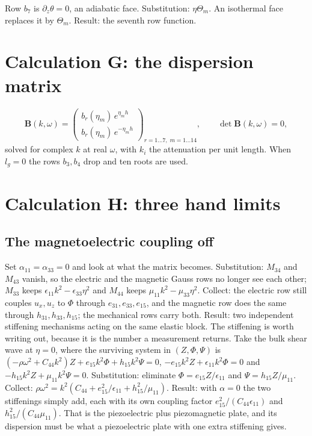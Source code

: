 \documentclass[11pt]{article}
\makeatletter
\newif\ifshowworked
\newenvironment{worked}{%
  \ifshowworked\par\smallskip\noindent\textit{Working.}\par\smallskip\else
  \setbox\z@\vbox\bgroup\fi}{\ifshowworked\par\smallskip\else\egroup\fi}
\makeatother
\begin{document}
\begin{worked}
Row $b_7$ is $\partial_z\theta=0$, an adiabatic face. Substitution: $\eta\Theta_m$. An isothermal face
replaces it by $\Theta_m$. Result: the seventh row function.
\end{worked}

\section{Calculation G: the dispersion matrix}\label{sec:calcG}

\begin{equation}
\mathbf B(k,\omega)=
\begin{pmatrix}
b_r(\eta_m)\,e^{\eta_mh}\\
b_r(\eta_m)\,e^{-\eta_mh}
\end{pmatrix}_{r=1\dots7,\;m=1\dots14},
\qquad \det\mathbf B(k,\omega)=0 ,
\end{equation}
solved for complex $k$ at real $\omega$, with $k_i$ the attenuation per unit length. When $l_g=0$ the rows
$b_3,b_4$ drop and ten roots are used.

\section{Calculation H: three hand limits}\label{sec:calcH}

\subsection*{The magnetoelectric coupling off}

\begin{worked}
Set $\alpha_{11}=\alpha_{33}=0$ and look at what the matrix becomes. Substitution: $M_{34}$ and $M_{43}$
vanish, so the electric and the magnetic Gauss rows no longer see each other; $M_{33}$ keeps
$\epsilon_{11}k^2-\epsilon_{33}\eta^2$ and $M_{44}$ keeps $\mu_{11}k^2-\mu_{33}\eta^2$. Collect: the
electric row still couples $u_x,u_z$ to $\Phi$ through $e_{31},e_{33},e_{15}$, and the magnetic row does
the same through $h_{31},h_{33},h_{15}$; the mechanical rows carry both. Result: two independent
stiffening mechanisms acting on the same elastic block.
The stiffening is worth writing out, because it is the number a measurement returns. Take the bulk shear
wave at $\eta=0$, where the surviving system in $(Z,\Phi,\Psi)$ is
$(-\rho\omega^2+C_{44}k^2)Z+e_{15}k^2\Phi+h_{15}k^2\Psi=0$,
$-e_{15}k^2Z+\epsilon_{11}k^2\Phi=0$ and $-h_{15}k^2Z+\mu_{11}k^2\Psi=0$.
Substitution: eliminate $\Phi=e_{15}Z/\epsilon_{11}$ and $\Psi=h_{15}Z/\mu_{11}$. Collect:
$\rho\omega^2=k^2(C_{44}+e_{15}^2/\epsilon_{11}+h_{15}^2/\mu_{11})$. Result: with $\alpha=0$ the two
stiffenings simply add, each with its own coupling factor $e_{15}^2/(C_{44}\epsilon_{11})$ and
$h_{15}^2/(C_{44}\mu_{11})$. That is the piezoelectric plus piezomagnetic plate, and its dispersion must
be what a piezoelectric plate with one extra stiffening gives.
\end{worked}
\end{document}
